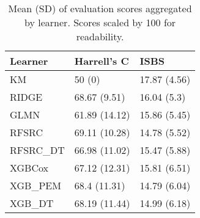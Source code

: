 \begin{table}
\centering
\caption{Mean (SD) of evaluation scores aggregated by learner. Scores scaled by 100 for readability.\label{tab:bm-aggr}}
\centering
\begin{tabular}[t]{lll}
\toprule
Learner & Harrell's C & ISBS\\
\midrule
KM & 50 (0) & 17.87 (4.56)\\
RIDGE & 68.67 (9.51) & 16.04 (5.3)\\
GLMN & 61.89 (14.12) & 15.86 (5.45)\\
RFSRC & 69.11 (10.28) & 14.78 (5.52)\\
RFSRC\_DT & 66.98 (11.02) & 15.47 (5.88)\\
XGBCox & 67.12 (12.31) & 15.81 (6.51)\\
XGB\_PEM & 68.4 (11.31) & 14.79 (6.04)\\
XGB\_DT & 68.19 (11.44) & 14.99 (6.18)\\
\bottomrule
\end{tabular}
\end{table}
